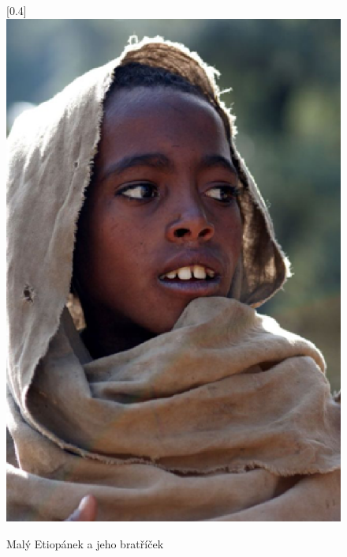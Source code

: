 \documentclass[a4paper,11pt,times]{article}
\begin{document}
\begin{figure}[ht]
    \scalebox{-0.4}[0.4]{\includegraphics[]{etiopan.eps}} \\
    \caption{Malý Etiopánek a jeho bratříček}
    \label{obr1}
\end{figure}

\newpage
\end{document}
